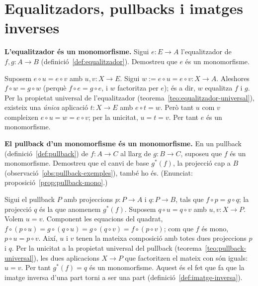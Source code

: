 \section{Equalitzadors, pullbacks i imatges inverses}\label{prac:equalitzadors-pullbacks}

\begin{exercici}
\textbf{L'equalitzador és un monomorfisme.} Sigui \(e:E\to A\) l'equalitzador de \(f,g:A\to B\) (definició~\ref{def:equalitzador}). Demostreu que \(e\) és un monomorfisme.
\end{exercici}
\begin{solucio}
Suposem \(e\circ u=e\circ v\) amb \(u,v:X\to E\). Sigui \(w:=e\circ u=e\circ v:X\to A\). Aleshores \(f\circ w=g\circ w\) (perquè \(f\circ e=g\circ e\), i \(w\) factoritza per \(e\)); és a dir, \(w\) equalitza \(f\) i \(g\). Per la propietat universal de l'equalitzador (teorema~\ref{teo:equalitzador-universal}), existeix una \emph{única} aplicació \(t:X\to E\) amb \(e\circ t=w\). Però tant \(u\) com \(v\) compleixen \(e\circ u=w=e\circ v\); per la unicitat, \(u=t=v\). Per tant \(e\) és un monomorfisme.
\end{solucio}

\begin{exercici}
\textbf{El pullback d'un monomorfisme és un monomorfisme.} En un pullback (definició~\ref{def:pullback}) de \(f:A\to C\) al llarg de \(g:B\to C\), suposeu que \(f\) és un monomorfisme. Demostreu que el canvi de base \(g^{*}(f)\), la projecció cap a \(B\) (observació~\ref{obs:pullback-exemples}), també ho és. (Enunciat: proposició~\ref{prop:pullback-mono}.)
\end{exercici}
\begin{solucio}
Sigui el pullback \(P\) amb projeccions \(p:P\to A\) i \(q:P\to B\), tals que \(f\circ p=g\circ q\); la projecció \(q\) és la que anomenem \(g^{*}(f)\). Suposem \(q\circ u=q\circ v\) amb \(u,v:X\to P\). Volem \(u=v\). Component les equacions del quadrat, \(f\circ(p\circ u)=g\circ(q\circ u)=g\circ(q\circ v)=f\circ(p\circ v)\); com que \(f\) és mono, \(p\circ u=p\circ v\). Així, \(u\) i \(v\) tenen la mateixa composició amb totes dues projeccions \(p\) i \(q\). Per la unicitat a la propietat universal del pullback (teorema~\ref{teo:pullback-universal}), les dues aplicacions \(X\to P\) que factoritzen el mateix con són iguals: \(u=v\). Per tant \(g^{*}(f)=q\) és un monomorfisme. Aquest és el fet que fa que la imatge inversa d'una part torni a ser una part (definició~\ref{def:imatge-inversa}).
\end{solucio}

